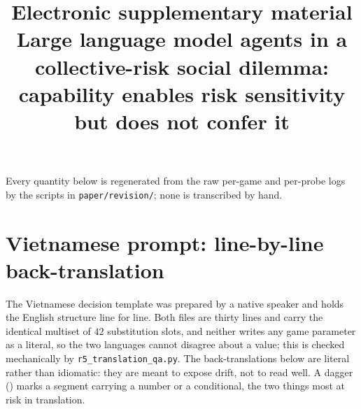 \documentclass[11pt,a4paper]{article}
\title{Electronic supplementary material\\[2pt]
\large Large language model agents in a collective-risk social dilemma:\\
capability enables risk sensitivity but does not confer it}
\author{}
\date{}
\begin{document}
\maketitle
\vspace{-2.4em}

\noindent Every quantity below is regenerated from the raw per-game and per-probe logs
by the scripts in \texttt{paper/revision/}; none is transcribed by hand.

\tableofcontents

\section{Vietnamese prompt: line-by-line back-translation}
\label{sec:backtranslation}

The Vietnamese decision template was prepared by a native speaker and holds the English
structure line for line. Both files are thirty lines and carry the identical multiset of
$42$ substitution slots, and neither writes any game parameter as a literal, so the two
languages cannot disagree about a value; this is checked mechanically by
\texttt{r5\_translation\_qa.py}. The back-translations below are literal rather than
idiomatic: they are meant to expose drift, not to read well. A dagger (\dag) marks a
segment carrying a number or a conditional, the two things most at risk in translation.
\end{document}
